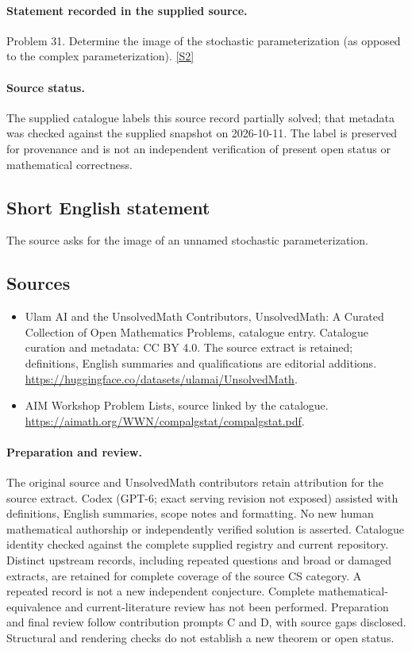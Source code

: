 \documentclass[11pt]{article}
\begin{document}
\paragraph{Statement recorded in the supplied source.}
Problem 31. Determine the image of the stochastic parameterization (as opposed to the complex parameterization). \href{https://aimath.org/WWN/compalgstat/compalgstat.pdf}{[S2]}
\paragraph{Source status.}
The supplied catalogue labels this source record partially solved; that metadata was checked against the supplied snapshot on 2026-10-11. The label is preserved for provenance and is not an independent verification of present open status or mathematical correctness.
\subsection{Short English statement}
The source asks for the image of an unnamed stochastic parameterization.
\subsection{Sources}
\begin{itemize}
\item[S1] Ulam AI and the UnsolvedMath Contributors, UnsolvedMath: A Curated Collection of Open Mathematics Problems, catalogue entry. Catalogue curation and metadata: CC BY 4.0. The source extract is retained; definitions, English summaries and qualifications are editorial additions.
\url{https://huggingface.co/datasets/ulamai/UnsolvedMath}.
\item[S2] AIM Workshop Problem Lists, source linked by the catalogue.
\url{https://aimath.org/WWN/compalgstat/compalgstat.pdf}.
\end{itemize}
\paragraph{Preparation and review.}
The original source and UnsolvedMath contributors retain attribution for the source extract. Codex (GPT-6; exact serving revision not exposed) assisted with definitions, English summaries, scope notes and formatting. No new human mathematical authorship or independently verified solution is asserted. Catalogue identity checked against the complete supplied registry and current repository. Distinct upstream records, including repeated questions and broad or damaged extracts, are retained for complete coverage of the source CS category. A repeated record is not a new independent conjecture. Complete mathematical-equivalence and current-literature review has not been performed. Preparation and final review follow contribution prompts C and D, with source gaps disclosed. Structural and rendering checks do not establish a new theorem or open status.
\label{end:statement}
\end{document}
